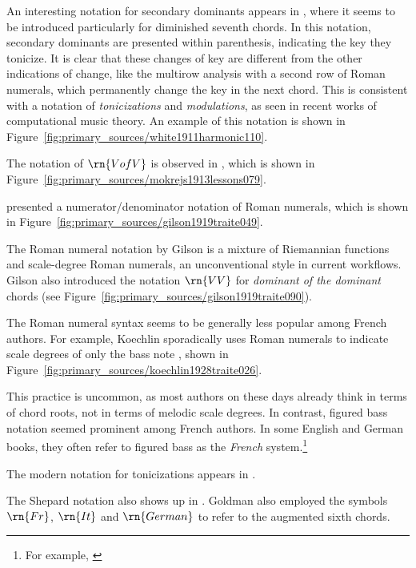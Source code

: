 An interesting notation for secondary dominants appears in \textcite{white1911harmonic}, where it seems to be introduced particularly for diminished seventh chords.
In this notation, secondary dominants are presented within parenthesis, indicating the key they tonicize.
It is clear that these changes of key are different from the other indications of change, like the multirow analysis with a second row of Roman numerals, which permanently change the key in the next chord.
This is consistent with a notation of \emph{tonicizations} and \emph{modulations}, as seen in recent works of computational music theory.
An example of this notation is shown in Figure~\ref{fig:primary_sources/white1911harmonic110}.


The notation of $\rn{V of V}$ is observed in \textcite{mokrejs1913lessons}, which is shown in Figure~\ref{fig:primary_sources/mokrejs1913lessons079}.


\textcite{gilson1919traite} presented a numerator/denominator notation of Roman numerals, which is shown in Figure~\ref{fig:primary_sources/gilson1919traite049}.



The Roman numeral notation by Gilson is a mixture of Riemannian functions and scale-degree Roman numerals, an unconventional style in current workflows.
Gilson also introduced the notation $\rn{VV}$ for \emph{dominant of the dominant} chords (see Figure~\ref{fig:primary_sources/gilson1919traite090}).

The Roman numeral syntax seems to be generally less popular among French authors.
For example, Koechlin sporadically uses Roman numerals to indicate scale degrees of only the bass note \textcite{koechlin1928traite}, shown in Figure~\ref{fig:primary_sources/koechlin1928traite026}.


This practice is uncommon, as most authors on these days already think in terms of chord roots, not in terms of melodic scale degrees.
In contrast, figured bass notation seemed prominent among French authors.
In some English and German books, they often refer to figured bass as the \emph{French} system.\footnote{For example, \textcite{norris1894practical}}

The modern notation for tonicizations appears in \textcite{tischler1964practical}.

The Shepard notation also shows up in \textcite{goldman1965harmony}.
Goldman also employed the symbols $\rn{Fr}$, $\rn{It}$ and $\rn{German}$ to refer to the augmented sixth chords.
